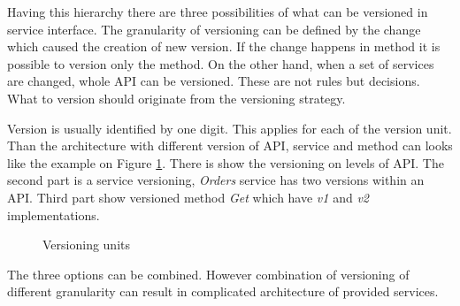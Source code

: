 Having this hierarchy there are three possibilities of what can be versioned in service interface. The granularity of versioning can be defined by the change which caused the creation of new version. If the change happens in method it is possible to version only the method. On the other hand, when a set of services are changed, whole API can be versioned. These are not rules but decisions. What to version should originate from the versioning strategy. 


Version is usually identified by one digit. This applies for each of the version unit. Than the architecture with different version of API, service and method can looks like the example on Figure \ref{fig:version-unit}. There is show the versioning on levels of API. The second part is a service versioning, \emph{Orders} service has two versions within an API. Third part show versioned method \emph{Get} which have \emph{v1} and \emph{v2} implementations.


\begin{figure}[htp] 
\caption{Versioning units}
\label{fig:version-unit}
\end{figure} 


The three options can be combined. However combination of versioning of different granularity can result in complicated architecture of provided services.


